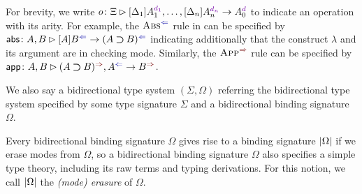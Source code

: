 For brevity, we write $o \colon \Xi \rhd [\Delta_1]A_{1}^{\dir{d_1}}, \ldots, [\Delta_{n}] A^{\dir{d_n}}_{n} \to A_0^{\dir{d}}$ to indicate an operation with its arity. 
For example, the $\ChkRule{Abs}$ rule in  can be specified by $\mathsf{abs}\colon A , B \rhd [A]B^{\chk} \to (A \bto B)^{\chk}$ indicating additionally that the construct $\lambda$ and its argument are in checking mode.
Similarly, the $\SynRule{App}$ rule can be specified by $\mathsf{app}\colon A, B \rhd (A \bto B)^{\syn}, A^{\chk} \to B^{\syn}$.

We also say a bidirectional type system $(\Sigma, \Omega)$ referring the bidirectional type system specified by some type signature $\Sigma$ and a bidirectional binding signature $\Omega$.

\begin{remark}
  Every bidirectional binding signature $\Omega$ gives rise to a binding signature $\left|\Omega\right|$ if we erase modes from $\Omega$, so a bidirectional binding signature $\Omega$ also specifies a simple type theory, including its raw terms and typing derivations.
  For this notion, we call $\left|\Omega\right|$ the \emph{(mode) erasure} of $\Omega$.
\end{remark}


